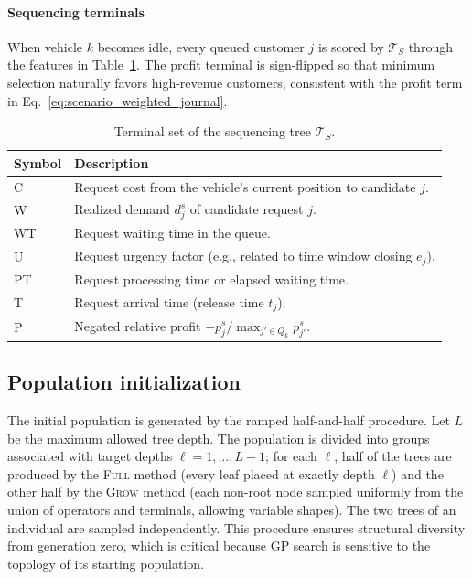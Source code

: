 \documentclass[pdflatex]{sn-jnl}
\begin{document}
\paragraph{Sequencing terminals}
When vehicle $k$ becomes idle, every queued customer $j$ is scored by
$\mathcal{T}_S$ through the features in
Table~\ref{tab:sequencing_terminals}. The profit terminal is sign-flipped
so that minimum selection naturally favors high-revenue customers,
consistent with the profit term in
Eq.~\eqref{eq:scenario_weighted_journal}.

\begin{table}[h!]
\centering
\caption{Terminal set of the sequencing tree $\mathcal{T}_S$.}
\label{tab:sequencing_terminals}
\begin{tabular}{lp{10cm}}
\toprule
Symbol & Description \\
\midrule
C  & Request cost from the vehicle's current position to candidate $j$. \\
W  & Realized demand $d_j^s$ of candidate request $j$. \\
WT & Request waiting time in the queue. \\
U  & Request urgency factor (e.g., related to time window closing $e_j$). \\
PT & Request processing time or elapsed waiting time. \\
T  & Request arrival time (release time $t_j$). \\
P  & Negated relative profit $-p_j^s/\max_{j'\in Q_k}p_{j'}^s$. \\
\bottomrule
\end{tabular}
\end{table}
\subsection{Population initialization} \label{subsec:init}

The initial population is generated by the ramped half-and-half
procedure. Let $L$ be the maximum allowed tree depth. The population is
divided into groups associated with target depths $\ell=1,\dots,L-1$;
for each $\ell$, half of the trees are produced by the \textsc{Full}
method (every leaf placed at exactly depth $\ell$) and the other half by
the \textsc{Grow} method (each non-root node sampled uniformly from the
union of operators and terminals, allowing variable shapes). The two
trees of an individual are sampled independently. This procedure ensures
structural diversity from generation zero, which is critical because GP
search is sensitive to the topology of its starting population.
\end{document}
